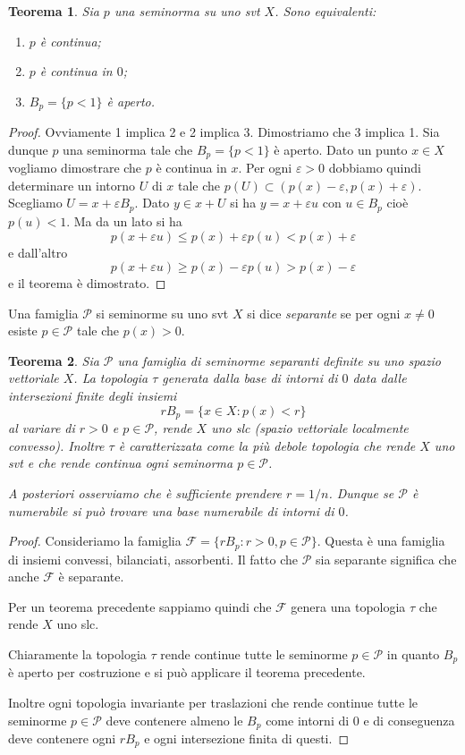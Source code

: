 \documentclass[italian,a4paper,oneside,headinclude]{scrbook}
\newcommand{\eps}{\varepsilon}
\newcommand{\F}{\mathcal F}
\renewcommand{\P}{\mathcal P}
\newtheorem{theorem}{Teorema}
\begin{document}
\begin{theorem}
  Sia $p$ una seminorma su uno svt $X$. Sono equivalenti:
  \begin{enumerate}
  \item $p$ è continua;
  \item $p$ è continua in $0$;
  \item $B_p=\{p<1\}$ è aperto.
  \end{enumerate}
\end{theorem}
\begin{proof}
  Ovviamente 1 implica 2 e 2 implica 3. Dimostriamo che 3 implica
  1. Sia dunque $p$ una seminorma tale che $B_p=\{ p<1 \}$ è aperto.
  Dato un punto $x\in X$ vogliamo dimostrare che $p$ è continua in
  $x$.
  Per ogni $\eps>0$ dobbiamo quindi determinare un intorno $U$ di $x$ tale che
  $p(U) \subset (p(x)-\eps, p(x)+\eps)$.
  Scegliamo $U = x + \eps B_p$. Dato $y\in x + U$ si ha
  $y= x + \eps u$
  con $u\in B_p$ cioè $p(u)< 1$. Ma da un lato si ha
  \[
  p(x+\eps u) \le p(x) + \eps p(u) < p(x) + \eps
  \]
  e dall'altro
  \[
  p(x+\eps u) \ge p(x) - \eps p(u) > p(x) - \eps
  \]
  e il teorema è dimostrato.
\end{proof}

Una famiglia $\P$ si seminorme su uno svt $X$ si dice \emph{separante}
se per ogni $x\neq 0$ esiste $p\in \P$ tale che $p(x)>0$.

\begin{theorem}
Sia $\P$ una famiglia di seminorme separanti definite su uno spazio vettoriale
$X$. La topologia $\tau$ generata dalla base di intorni di $0$
data dalle intersezioni finite degli insiemi
\[
 r B_p = \{x\in X \colon p(x) < r\}
\]
al variare di $r>0$ e $p\in \P$, rende $X$ uno slc (spazio vettoriale
localmente convesso). Inoltre $\tau$ è
caratterizzata come la più debole topologia che rende $X$ uno svt
e che rende continua ogni
seminorma $p\in \P$.

A posteriori osserviamo che è sufficiente prendere $r=1/n$. Dunque se
$\P$ è numerabile si può trovare una base numerabile di intorni di $0$.
\end{theorem}
\begin{proof}
  Consideriamo la famiglia $\F=\{ r B_p \colon r>0, p\in \P\}$. Questa
  è una famiglia di insiemi convessi, bilanciati, assorbenti.
  Il fatto che $\P$ sia separante significa che anche $\F$ è
  separante.

  Per un teorema precedente sappiamo quindi
  che $\F$ genera una topologia $\tau$ che rende $X$ uno
  slc.

  Chiaramente la topologia $\tau$ rende continue tutte le seminorme
  $p\in \P$ in quanto $B_p$ è aperto per costruzione
  e si può applicare il teorema precedente.

  Inoltre ogni topologia invariante per traslazioni
  che rende continue tutte le seminorme
  $p\in \P$ deve contenere almeno le $B_p$ come intorni di $0$ e di
  conseguenza deve contenere ogni $r B_p$ e ogni intersezione finita
  di questi.
\end{proof}
\end{document}
